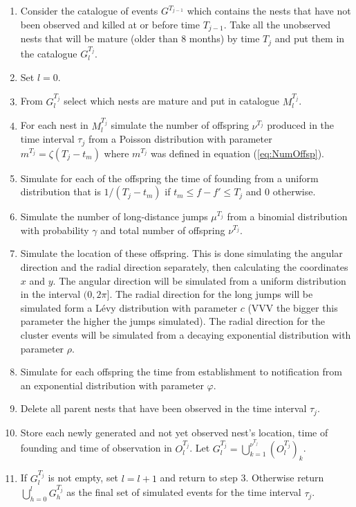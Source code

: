 \begin{enumerate}
    \item Consider the catalogue of events $G^{T_{j-1}}$ which contains the nests that have not been observed and killed at or before time $T_{j-1}$. Take all the unobserved nests that will be mature (older than 8 months) by time $T_j$ and put them in the catalogue $G_l^{T_j}$.
    \item Set $l = 0$.
    \item From $G_l^{T_j}$ select which nests are mature and put in catalogue $M_l^{T_j}$.
    \item For each nest in $M_l^{T_j}$ simulate the number of offspring $\nu^{T_j}$ produced in the time interval $\tau_j$ from a Poisson distribution with parameter $ m^{T_j} = \zeta (T_j-t_m)$ where $m^{T_j}$ was defined in equation (\ref{eq:NumOffsp}).
    \item Simulate for each of the offspring the time of founding from a uniform distribution that is $1/(T_j-t_m)$ if $t_m \leq f - f' \leq T_j$ and $0$ otherwise.
    \item Simulate the number of long-distance jumps $\mu^{T_j}$ from a binomial distribution with probability $\gamma$ and total number of offspring $\nu^{T_j}$.
    \item Simulate the location of these offspring. This is done simulating the angular direction and the radial direction separately, then calculating the coordinates $x$ and $y$. The angular direction will be simulated from a uniform distribution in the interval $(0, 2\pi]$. The radial direction for the long jumps will be simulated form a L\'evy distribution with parameter $c$ (VVV the bigger this parameter the higher the jumps simulated). The radial direction for the cluster events will be simulated from a decaying exponential distribution with parameter $\rho$.
    \item Simulate for each offspring the time from establishment to notification from an exponential distribution with parameter $\varphi$.
    \item Delete all parent nests that have been observed in the time interval $\tau_j$.
    \item Store each newly generated and not yet observed nest's location, time of founding and time of observation in $O_l^{T_j}$. Let $G_{l}^{T_j} = \bigcup_{k=1}^{\nu^{T_j}} (O_l^{T_j})_k$.
    \item If $G_l^{T_j}$ is not empty, set $l = l+1$ and return to step 3. Otherwise return $\bigcup_{h=0}^l G^{T_j}_h$ as the final set of simulated events for the time interval $\tau_j$.

\end{enumerate}



